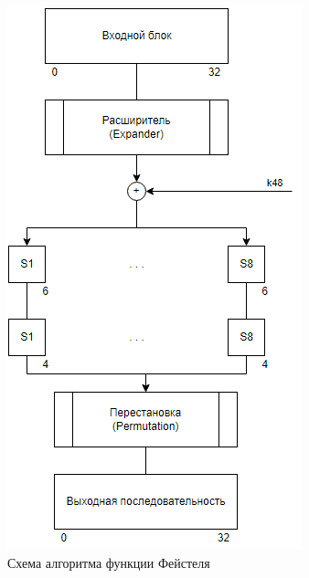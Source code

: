 \clearpage

\begin{figure}[ht!]
	\centering
	\includegraphics[width=0.5\linewidth]{img/function.png}
	\caption{Схема алгоритма функции Фейстеля}
	\label{fig:des-f}
\end{figure}

